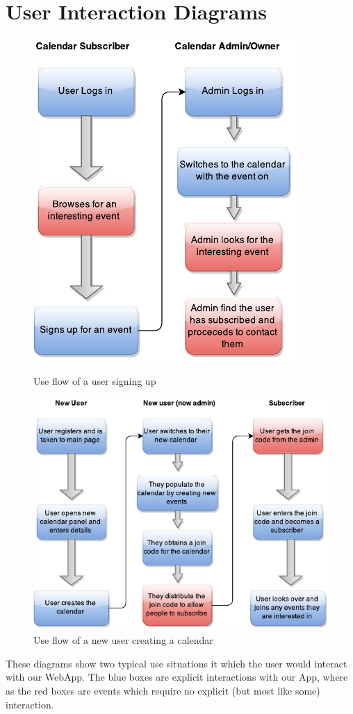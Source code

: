 \documentclass[11pt,a4paper]{article}
\begin{document}
\section{User Interaction Diagrams}
\label{sec:fd}
\begin{figure}[H]
\centering
\begin{minipage}{.4\textwidth}
  \centering
  \includegraphics[width=1\linewidth]{user_event}
  \caption{Use flow of a user signing up}
\end{minipage}%
\begin{minipage}{.7\textwidth}
  \centering
  \includegraphics[width=0.9\linewidth]{calendar_user}
  \caption{Use flow of a new user creating a calendar}
\end{minipage}
\end{figure}
\noindent These diagrams show two typical use situations it which the user would interact with our WebApp. The blue boxes are explicit interactions with our App, where as the red boxes are events which require no explicit (but most like some) interaction.
\end{document}
